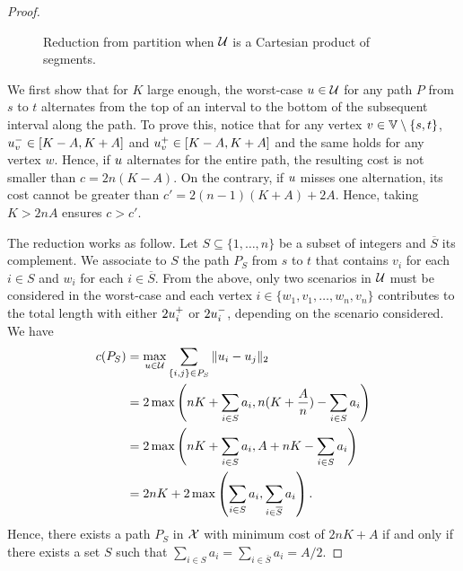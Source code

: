 \documentclass[12pt]{article}
\begin{document}
\begin{proof}
\begin{figure}[!h]
\caption{\label{fig:SPNPhardSeg} Reduction from partition when $\mathcal{U}$ is a Cartesian product of segments.}
\end{figure}

We first show that for $K$ large enough, the worst-case $u\in\mathcal{U}$ for any path $P$ from $s$ to $t$ alternates from the top of an interval to the bottom of the subsequent interval along the path. To prove this, notice that for any vertex $v\in \mathbb{V} \setminus\{s,t\}$, ${u}^-_v\in[K-A,K+A]$ and ${u}^+_v\in[K-A,K+A]$ and the same holds for any vertex $w$. Hence, if $u$ alternates for the entire path, the resulting cost is not smaller than $c=2n(K-A)$. On the contrary, if $u$ misses one alternation, its cost cannot be greater than $c'=2(n-1)(K+A)+2A$. Hence, taking $K > 2nA$ ensures $c > c'$. 

The reduction works as follow. Let $S\subseteq\{1,\ldots,n\}$ be a subset of integers and $\overline{S}$ its complement. We associate to $S$ the path $P_S$ from $s$ to $t$ that contains $v_i$ for each $i\in S$ and $w_i$ for each $i\in\overline{S}$. From the above, only two scenarios in $\mathcal{U}$ must be considered in the worst-case and each vertex $i\in \{w_1,v_1,\ldots,w_n,v_n\}$ contributes to the total length with either $2{u}^+_i$ or $2{u}^-_i$, depending on the scenario considered. We have
\begin{align*}
c(P_S) &= \max_{u\in\mathcal{U}}\sum_{\{i,j\}\in P_S} \|u_i-u_j\|_2 \\
&=2\max\left(nK+\sum_{i\in S}a_i,n(K+\frac{A}{n})-\sum_{i\in S}a_i\right) \\
&=2\max\left(nK+\sum_{i\in S}a_i,A + nK-\sum_{i\in S}a_i\right) \\
&=2nK + 2\max\left(\sum_{i\in S}a_i,\sum_{i\in \overline{S}}a_i\right).
\end{align*}
Hence, there exists a path $P_S$ in $\mathcal{X}$ with minimum cost of $2nK+A$ if and only if there exists a set $S$ such that $\sum_{i\in S} a_i = \sum_{i\in \overline{S}} a_i=A/2$.
\end{proof}
\end{document}
